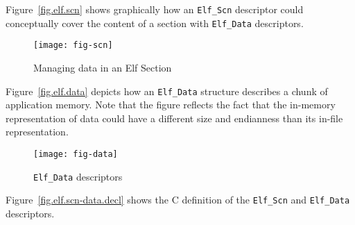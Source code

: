\documentclass[a4paper]{book}
\newcommand{\type}[1]{\texttt{#1}}
\begin{document}
Figure~\vref{fig.elf.scn} shows graphically how an \type{Elf\_Scn}
descriptor could conceptually cover the content of a section with
\type{Elf\_Data} descriptors.

\begin{figure}
  \begin{center}
    \texttt{[image: fig-scn]}
  \end{center}
  \caption{Managing data in an Elf Section}\label{fig.elf.scn}
\end{figure}

Figure~\vref{fig.elf.data} depicts how an \type{Elf\_Data} structure
describes a chunk of application memory.  Note that the figure
reflects the fact that the in-memory representation of data could have
a different size and endianness than its in-file
representation.

\begin{figure}
  \begin{center}
    \texttt{[image: fig-data]}
  \end{center}
  \caption{\type{Elf\_Data} descriptors}\label{fig.elf.data}
\end{figure}

Figure~\vref{fig.elf.scn-data.decl} shows the C definition of the
\type{Elf\_Scn} and \type{Elf\_Data} descriptors.
\end{document}
